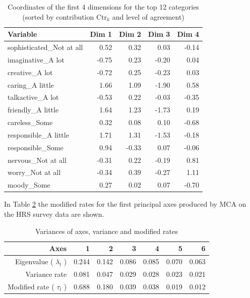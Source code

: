 \documentclass[conference,final,]{IEEEtran}
\begin{document}
\begin{table}[H]
\caption{Coordinates of the first 4 dimensions for the top 12 categories (sorted by contribution $\text{Ctr}_k$ and level of agreement)} 
\centering
\begin{tabular}{lrrrr}
  \hline
  Variable & Dim 1 & Dim 2 & Dim 3 & Dim 4 \\ 
  \hline
  sophisticated\_Not at all & 0.52 & 0.32 & 0.03 & -0.14 \\ 
  imaginative\_A lot & -0.75 & 0.23 & -0.20 & 0.04 \\ 
  creative\_A lot & -0.72 & 0.25 & -0.23 & 0.03 \\ 
  caring\_A little & 1.66 & 1.09 & -1.90 & 0.58 \\ 
  talkactive\_A lot & -0.53 & 0.22 & -0.03 & -0.35 \\ 
  friendly\_A little & 1.64 & 1.23 & -1.73 & 0.19 \\ 
  careless\_Some & 0.32 & 0.08 & 0.10 & -0.68 \\ 
  responsible\_A little & 1.71 & 1.31 & -1.53 & -0.18 \\ 
  responsible\_Some & 0.94 & -0.33 & 0.07 & -0.06 \\ 
  nervous\_Not at all & -0.31 & 0.22 & -0.19 & 0.81 \\ 
  worry\_Not at all & -0.34 & 0.39 & -0.27 & 1.11 \\ 
  moody\_Some & 0.27 & 0.02 & 0.07 & -0.70 \\ 
   \hline
\end{tabular}
\label{tab:top12coord}
\end{table}

In Table \ref{tab:modRate} the modified rates for the first principal
axes produced by MCA on the HRS survey data are shown.

\begin{table}[!ht]
\caption{Variances of axes, variance and modified rates} 
\centering
\begin{tabular}{rrrrrrr}
\hline
Axes & 1 & 2 & 3 & 4 & 5 & 6  \\ 
\hline
Eigenvalue ( $ \lambda_l $ ) & 0.244 & 0.142 & 0.086 & 0.085 & 0.070 & 0.063  \\  
Variance rate                & 0.081 & 0.047 & 0.029 & 0.028 & 0.023 & 0.021  \\  
Modified rate ( $ \tau_l $ ) & 0.688 & 0.180 & 0.039 & 0.038 & 0.019 & 0.012  \\ 
\hline
\end{tabular}
\label{tab:modRate}
\end{table}
\end{document}
